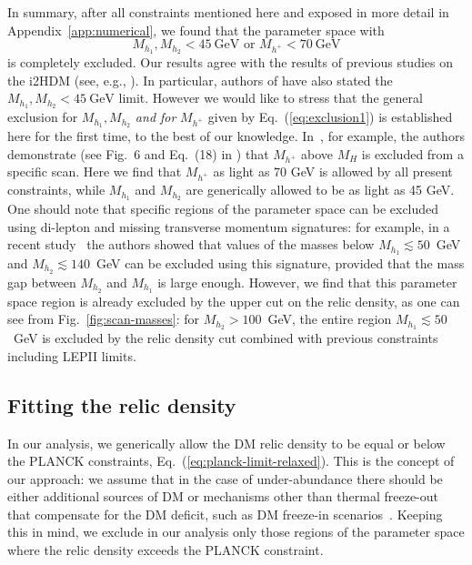 \documentclass[12pt,a4paper]{article}
\begin{document}
In summary, after all constraints mentioned here and exposed in more detail in Appendix~\ref{app:numerical},
we found that the parameter space with  
\begin{equation}
M_{h_1},M_{h_2}<45~\mbox{GeV} 
\mbox{\ or\ } M_{h^+}<70~\mbox{GeV} 
\label{eq:exclusion1}
\end{equation}
is completely excluded. Our results  agree with the results of previous studies on the i2HDM (see, e.g., \cite{Arhrib:2013ela,Ilnicka:2015jba}).
In particular, authors of \cite{Ilnicka:2015jba} have also stated 
the $M_{h_1},M_{h_2}<45~\mbox{GeV}$ limit.
However we would like to stress that the general exclusion 
for $M_{h_1},M_{h_2}$ {\it and for} $M_{h^+}$
given by Eq.~(\ref{eq:exclusion1}) is established here for the first time, to the best of our knowledge. In~\cite{Ilnicka:2015jba}, for example,  the authors demonstrate 
(see Fig.~6 and Eq.~(18) in \cite{Ilnicka:2015jba}) that 
$M_{h^+}$ above $M_H$ is excluded from a  specific scan. Here we find that
$M_{h^+}$ as light as 70 GeV  is allowed by all present constraints, while $M_{h_1}$ and
$M_{h_2}$ are generically allowed to be as light as 45 GeV. One should note that specific regions of the
parameter space can be excluded using di-lepton and missing transverse momentum
signatures: for example, in a recent study~\cite{Belanger:2015kga} the authors showed that values of the masses below
$M_{h_1}\lesssim 50$~GeV and  $M_{h_2}\lesssim 140$~GeV can be excluded using this signature,
provided that the mass gap between $M_{h_2}$ and $M_{h_1}$ is large enough. However, we find that this parameter
space region is already excluded by the upper cut on the relic density, as one can see
from Fig.~\ref{fig:scan-masses}: for  $M_{h_2}>100$~GeV, the entire region $M_{h_1}\lesssim
50$~GeV  is excluded by the relic density cut combined with previous constraints including LEPII limits.

\subsection{Fitting the relic density}

In our analysis, we generically allow the DM relic density to be equal or
below the PLANCK constraints, Eq.~(\ref{eq:planck-limit-relaxed}).
This is the concept of our approach: we assume that in the case of under-abundance
there should be either additional sources of DM or mechanisms other than thermal freeze-out that 
compensate for the DM deficit, such as DM freeze-in scenarios~\cite{Hall:2009bx}.
Keeping this in mind, we exclude in our analysis only those regions of the parameter space 
where the relic density exceeds the PLANCK constraint.
\end{document}
